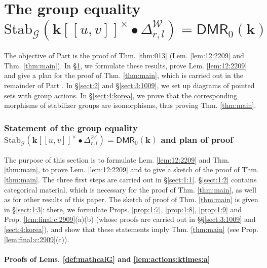 \documentclass[10pt]{amsart}
\numberwithin{equation}{subsection}
\begin{document}
\newpage 



\part{The group equality $\mathrm{Stab}_{\mathcal G}(\mathbf k[[u,v]]^\times\bullet\Delta^{\mathcal W}_{r,l}
)=\mathsf{DMR}_0(\mathbf k)$}\label{part 1}

The objective of Part \ref{part 1} is the proof of Thm. \ref{thm:013} (Lem. \ref{lem:12:2209} and 
Thm. \ref{thm:main}).  
In §\ref{sect:1}, we formulate these results, prove Lem. \ref{lem:12:2209} and give a 
plan for the proof of Thm. 
\ref{thm:main}, which is carried out in the remainder of Part \ref{part 1}. In 
§\ref{sect:2} and §\ref{sect:3:1009}, we set up diagrams of 
pointed sets with group actions.
In §\ref{sect:4:korea}, we prove that the corresponding morphisms of stabilizer groups are isomorphisms, thus 
proving Thm. \ref{thm:main}.


\section{Statement of the group equality  $\mathrm{Stab}_{\mathcal G}(\mathbf k[[u,v]]^\times\bullet\Delta^{\mathcal W}_{r,l}
)=\mathsf{DMR}_0(\mathbf k)$ and plan of proof}\label{sect:1}

The purpose of this section is to formulate Lem. \ref{lem:12:2209} and Thm. \ref{thm:main}, to prove 
Lem. \ref{lem:12:2209} and to give a sketch of the proof of Thm. \ref{thm:main}. The three first steps are 
carried out in §\ref{sect:1:1}. §\ref{sect:1:2} contains categorical material, which is necessary for 
the proof of Thm. \ref{thm:main}, as well as for other results of this paper. The sketch of proof of 
Thm. \ref{thm:main} is given in §\ref{sect:1:3}: there, we formulate Props. \ref{prop:1:7}, \ref{prop:1:8}, 
\ref{prop:1:9} and Prop. \ref{lem:final:c:2909}(a)(b) (whose proofs are carried out in §§\ref{sect:3:1009} 
and \ref{sect:4:korea}), and show that these statements imply Thm. \ref{thm:main} (see Prop. 
\ref{lem:final:c:2909}(c)).

\subsection{Proofs of Lems. \ref{def:mathcalG} and \ref{lem:actions:ktimes:a}}
\end{document}
